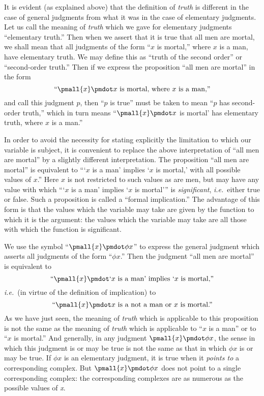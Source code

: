 \documentclass[letterpaper,12pt,openany,leqno]{book}
\newcommand{\pagefirst}[1]{\marginnote[\boxed{\text{#1}}]{\boxed{\text{#1}}}}
\begin{document}
It is evident (as explained above) that the definition of \textit{truth} is different \pagefirst{48} in the case of general judgments from what it was in the case of elementary judgments. Let us call the meaning of \textit{truth} which we gave for elementary judgments ``elementary truth.'' Then when we assert that it is true that all men are mortal, we shall mean that all judgments of the form ``$x$ is mortal,'' where $x$ is a man, have elementary truth. We may define this as ``truth of the second order'' or ``second-order truth.'' Then if we express the proposition ``all men are mortal'' in the form 
\[
	\text{``} \pmall{x} \pmdot x \text{ is mortal, where } x \text{ is a man,''} 
\]
and call this judgment $p$, then ``$p$ is true'' must be taken to mean ``$p$ has second-order truth,'' which in turn means 
``$\pmall{x} \pmdot x$ is mortal' has elementary truth, where $x$ is a man.''

In order to avoid the necessity for stating explicitly the limitation to which our variable is subject, it is convenient to replace the above interpretation of ``all men are mortal'' by a slightly different interpretation. The proposition ``all men are mortal'' is equivalent to ```$x$ is a man' implies `$x$ is mortal,' with all possible values of $x$.'' Here $x$ is not restricted to such values as are men, but may have any value with which ```$x$ is a man' implies `$x$ is mortal''' is \textit{significant}, \textit{i.e.}\ either true or false. Such a proposition is called a ``formal implication.'' The advantage of this form is that the values which the variable may take are given by the function to which it is the argument: the values which the variable may take are all those with which the function is significant.
 
We use the symbol ``$\pmall{x} \pmdot \phi x$'' to express the general judgment which asserts all judgments of the form ``$\phi x$.'' Then the judgment ``all men are mortal'' is equivalent to 
\[
	\text{``} \pmall{x} \pmdot \text{`}x \text{ is a man' implies `} x \text{ is mortal,''} 
\]
\textit{i.e.}\ (in virtue of the definition of implication) to
\[
	\text{``} \pmall{x} \pmdot x \text{ is a not a man or } x \text{ is mortal.''} 
\]
As we have just seen, the meaning of \textit{truth} which is applicable to this proposition is not the same as the meaning of \textit{truth} which is applicable to ``$x$ is a man'' or to ``$x$ is mortal.'' And generally, in any judgment $\pmall{x} \pmdot \phi x$, the sense in which this judgment is or may be true is not the same as that in which $\phi x$ is or may be true. If $\phi x$ is an elementary judgment, it is true when it \textit{points to} a corresponding complex. But $\pmall{x} \pmdot \phi x$ does not point to a single corresponding complex: the corresponding complexes are as numerous as the possible values of \textit{x}.
\end{document}
